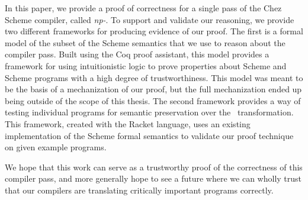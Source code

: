 In this paper, we provide a proof of correctness for a single pass of the Chez Scheme compiler, called \textit{np-}\caname. To support and validate our reasoning, we provide two different frameworks for producing evidence of our proof. The first is a formal model of the subset of the Scheme semantics that we use to reason about the compiler pass. Built using the Coq proof assistant, this model provides a framework for using intuitionistic logic to prove properties about Scheme and Scheme programs with a high degree of trustworthiness. This model was meant to be the basis of a mechanization of our proof, but the full mechanization ended up being outside of the scope of this thesis. The second framework provides a way of testing individual programs for semantic preservation over the \caname\ transformation. This framework, created with the Racket language, uses an existing implementation of the Scheme formal semantics to validate our proof technique on given example programs.

We hope that this work can serve as a trustworthy proof of the correctness of this compiler pass, and more generally hope to see a future where we can wholly trust that our compilers are translating critically important programs correctly.